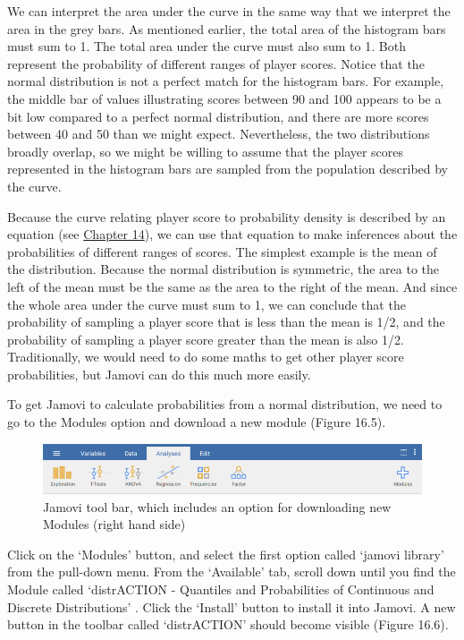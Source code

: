 \documentclass[
]{scrbook}
\begin{document}
We can interpret the area under the curve in the same way that we interpret the area in the grey bars.
As mentioned earlier, the total area of the histogram bars must sum to 1.
The total area under the curve must also sum to 1.
Both represent the probability of different ranges of player scores.
Notice that the normal distribution is not a perfect match for the histogram bars.
For example, the middle bar of values illustrating scores between 90 and 100 appears to be a bit low compared to a perfect normal distribution, and there are more scores between 40 and 50 than we might expect.
Nevertheless, the two distributions broadly overlap, so we might be willing to assume that the player scores represented in the histogram bars are sampled from the population described by the curve.

Because the curve relating player score to probability density is described by an equation (see \protect\hyperlink{Chapter_14}{Chapter 14}), we can use that equation to make inferences about the probabilities of different ranges of scores.
The simplest example is the mean of the distribution.
Because the normal distribution is symmetric, the area to the left of the mean must be the same as the area to the right of the mean.
And since the whole area under the curve must sum to 1, we can conclude that the probability of sampling a player score that is less than the mean is 1/2, and the probability of sampling a player score greater than the mean is also 1/2.
Traditionally, we would need to do some maths to get other player score probabilities, but Jamovi can do this much more easily.

To get Jamovi to calculate probabilities from a normal distribution, we need to go to the Modules option and download a new module (Figure 16.5).

\begin{figure}
\includegraphics[width=1\linewidth]{img/jamovi_toolbar_modules} \caption{Jamovi tool bar, which includes an option for downloading new Modules (right hand side)}\label{fig:unnamed-chunk-71}
\end{figure}

Click on the `Modules' button, and select the first option called `jamovi library' from the pull-down menu.
From the `Available' tab, scroll down until you find the Module called `distrACTION - Quantiles and Probabilities of Continuous and Discrete Distributions' \citep{Rihs2018}.
Click the `Install' button to install it into Jamovi.
A new button in the toolbar called `distrACTION' should become visible (Figure 16.6).
\end{document}
